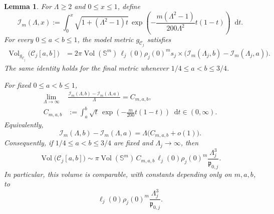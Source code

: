 \documentclass[11pt,reqno]{amsart}
\newtheorem{lemma}[theorem]{Lemma}
\theoremstyle{definition}
\numberwithin{equation}{section}
\newcommand{\dd}{\mathop{}\!\mathrm d}
\begin{document}
\begin{lemma}
\label{lem:protected-connector-volume}
For $\Lambda\ge2$ and $0\le x\le1$, define
\[
 \mathcal I_m(\Lambda,x)
 :=
 \int_0^x
 \sqrt{1+(\Lambda^2-1)t}\,
 \exp\left(
   -\frac{m(\Lambda^2-1)}{200\Lambda^2}t(1-t)
 \right)\dd t.
 \tag{8.15}\label{eq:dimensionless-volume-function}
\]
For every $0\le a<b\le1$, the model metric $g_{\mathcal C_j}$ satisfies
\[
 \begin{aligned}
 \operatorname{Vol}_{g_{\mathcal C_j}}
 \bigl(\mathcal C_j[a,b]\bigr)
 &=
 2\pi\operatorname{Vol}(\mathbb S^m)\,
 \ell_j(0)\rho_j(0)^m s_j \times
 \bigl(
   \mathcal I_m(\Lambda_j,b)
   -\mathcal I_m(\Lambda_j,a)
 \bigr).
 \end{aligned}
 \tag{8.16}\label{eq:protected-connector-volume}
\]
The same identity holds for the final metric whenever
$1/4\le a<b\le3/4$.

For fixed $0\le a<b\le1$,
\[
 \begin{aligned}
 \lim_{\Lambda\to\infty}&
 \frac{
   \mathcal I_m(\Lambda,b)-\mathcal I_m(\Lambda,a)
 }{\Lambda}
 =
 C_{m,a,b},\\
 C_{m,a,b}
 &:=
 \int_a^b
 \sqrt t\,
 \exp\left(-\frac{m}{200}t(1-t)\right)\dd t
 \in(0,\infty).
 \end{aligned}
 \tag{8.17}\label{eq:dimensionless-volume-asymptotic}
\]
Equivalently,
\[
 \mathcal I_m(\Lambda,b)-\mathcal I_m(\Lambda,a)
 =
 \Lambda\bigl(C_{m,a,b}+o(1)\bigr).
\]
Consequently, if $1/4\le a<b\le3/4$ are fixed and
$\Lambda_j\to\infty$, then
\[
 \operatorname{Vol}
 \bigl(\mathcal C_j[a,b]\bigr)
 \sim
 \pi\operatorname{Vol}(\mathbb S^m)\,C_{m,a,b}\,
 \ell_j(0)\rho_j(0)^m
 \frac{\Lambda_j^3}{\mathfrak p_{0,j}}.
 \tag{8.18}\label{eq:connector-volume-scale}
\]
In particular, this volume is comparable, with constants depending
only on $m,a,b$, to
\[
 \ell_j(0)\rho_j(0)^m
 \frac{\Lambda_j^3}{\mathfrak p_{0,j}}.
\]
\end{lemma}
\end{document}
